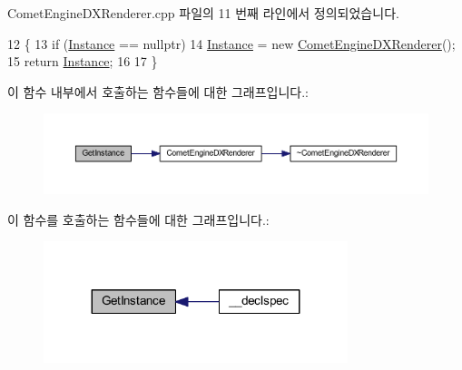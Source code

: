Comet\+Engine\+D\+X\+Renderer.\+cpp 파일의 11 번째 라인에서 정의되었습니다.


\begin{DoxyCode}
12 \{
13     \textcolor{keywordflow}{if} (\hyperlink{class_comet_engine_1_1_renderer_1_1_comet_engine_d_x_renderer_af2bbff1b1d0120cc652b4f2198ddb04a}{Instance} == \textcolor{keyword}{nullptr})
14         \hyperlink{class_comet_engine_1_1_renderer_1_1_comet_engine_d_x_renderer_af2bbff1b1d0120cc652b4f2198ddb04a}{Instance} = \textcolor{keyword}{new} \hyperlink{class_comet_engine_1_1_renderer_1_1_comet_engine_d_x_renderer_a5d4d4453042540bd1f4e4a36229b62f6}{CometEngineDXRenderer}();
15     \textcolor{keywordflow}{return} \hyperlink{class_comet_engine_1_1_renderer_1_1_comet_engine_d_x_renderer_af2bbff1b1d0120cc652b4f2198ddb04a}{Instance};
16 
17 \}
\end{DoxyCode}
이 함수 내부에서 호출하는 함수들에 대한 그래프입니다.\+:\nopagebreak
\begin{figure}[H]
\begin{center}
\leavevmode
\includegraphics[width=350pt]{class_comet_engine_1_1_renderer_1_1_comet_engine_d_x_renderer_a9894517531990b824a58e1f61c6d542e_cgraph}
\end{center}
\end{figure}
이 함수를 호출하는 함수들에 대한 그래프입니다.\+:\nopagebreak
\begin{figure}[H]
\begin{center}
\leavevmode
\includegraphics[width=251pt]{class_comet_engine_1_1_renderer_1_1_comet_engine_d_x_renderer_a9894517531990b824a58e1f61c6d542e_icgraph}
\end{center}
\end{figure}
\mbox{\label{class_comet_engine_1_1_renderer_1_1_comet_engine_d_x_renderer_a570783c0a51edd5394fdb16137ae37c1}} 
